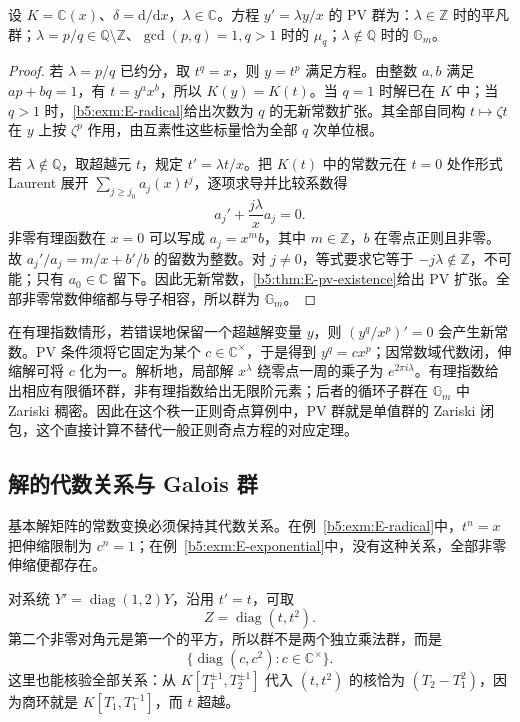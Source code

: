 \begin{proposition}\label{b5:prop:E-rank-one-exponent}
	设 \(K=\mathbb C(x)\)、\(\delta=\mathrm d/\mathrm dx\)，\(\lambda\in\mathbb C\)。方程 \(y'=\lambda y/x\) 的 PV 群为：\(\lambda\in\mathbb Z\) 时的平凡群；\(\lambda=p/q\in\mathbb Q\setminus\mathbb Z\)、\(\gcd(p,q)=1,q>1\) 时的 \(\mu_q\)；\(\lambda\notin\mathbb Q\) 时的 \(\mathbb G_m\)。
\end{proposition}
\begin{proof}
	若 \(\lambda=p/q\) 已约分，取 \(t^q=x\)，则 \(y=t^p\) 满足方程。由整数 \(a,b\) 满足 \(ap+bq=1\)，有 \(t=y^ax^b\)，所以 \(K(y)=K(t)\)。当 \(q=1\) 时解已在 \(K\) 中；当 \(q>1\) 时，\cref{b5:exm:E-radical}给出次数为 \(q\) 的无新常数扩张。其全部自同构 \(t\mapsto\zeta t\) 在 \(y\) 上按 \(\zeta^p\) 作用，由互素性这些标量恰为全部 \(q\) 次单位根。

	若 \(\lambda\notin\mathbb Q\)，取超越元 \(t\)，规定 \(t'=\lambda t/x\)。把 \(K(t)\) 中的常数元在 \(t=0\) 处作形式 Laurent 展开 \(\sum_{j\ge j_0}a_j(x)t^j\)，逐项求导并比较系数得
	\[
		a_j'+\frac{j\lambda}{x}a_j=0.
	\]
	非零有理函数在 \(x=0\) 可以写成 \(a_j=x^m b\)，其中 \(m\in\mathbb Z\)，\(b\) 在零点正则且非零。故 \(a_j'/a_j=m/x+b'/b\) 的留数为整数。对 \(j\ne0\)，等式要求它等于 \(-j\lambda\notin\mathbb Z\)，不可能；只有 \(a_0\in\mathbb C\) 留下。因此无新常数，\cref{b5:thm:E-pv-existence}给出 PV 扩张。全部非零常数伸缩都与导子相容，所以群为 \(\mathbb G_m\)。
\end{proof}

在有理指数情形，若错误地保留一个超越解变量 \(y\)，则 \((y^q/x^p)'=0\) 会产生新常数。PV 条件须将它固定为某个 \(c\in\mathbb C^\times\)，于是得到 \(y^q=cx^p\)；因常数域代数闭，伸缩解可将 \(c\) 化为一。解析地，局部解 \(x^\lambda\) 绕零点一周的乘子为 \(e^{2\pi i\lambda}\)。有理指数给出相应有限循环群，非有理指数给出无限阶元素；后者的循环子群在 \(\mathbb G_m\) 中 Zariski 稠密。因此在这个秩一正则奇点算例中，PV 群就是单值群的 Zariski 闭包，这个直接计算不替代一般正则奇点方程的对应定理。

\subsection{解的代数关系与 Galois 群}
\label{b5:subsec:E03:02}

基本解矩阵的常数变换必须保持其代数关系。在例~\ref{b5:exm:E-radical}中，\(t^n=x\) 把伸缩限制为 \(c^n=1\)；在例~\ref{b5:exm:E-exponential}中，没有这种关系，全部非零伸缩便都存在。

\ProseParagraphBreak
对系统 \(Y'=\operatorname{diag}(1,2)Y\)，沿用 \(t'=t\)，可取
\[
	Z=\operatorname{diag}(t,t^2).
\]
第二个非零对角元是第一个的平方，所以群不是两个独立乘法群，而是
\[
	\bigl\{\operatorname{diag}(c,c^2):c\in\mathbb C^\times\bigr\}.
\]
这里也能核验全部关系：从 \(K[T_1^{\pm1},T_2^{\pm1}]\) 代入 \((t,t^2)\) 的核恰为 \((T_2-T_1^2)\)，因为商环就是 \(K[T_1,T_1^{-1}]\)，而 \(t\) 超越。

